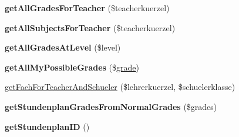 \begin{DoxyCompactItemize}
{\bfseries get\+All\+Grades\+For\+Teacher} (\$teacherkuerzel)
\item 
\mbox{\label{classstundenplandata_a04410dd17ae70a2995c9ba744c78d4b8}} 
{\bfseries get\+All\+Subjects\+For\+Teacher} (\$teacherkuerzel)
\item 
\mbox{\label{classstundenplandata_ad51fb9b961838ae004e1e857052d9a2c}} 
{\bfseries get\+All\+Grades\+At\+Level} (\$level)
\item 
\mbox{\label{classstundenplandata_ad59ea2d17858e909714558bb6c4b174a}} 
{\bfseries get\+All\+My\+Possible\+Grades} (\$\mbox{\hyperlink{classgrade}{grade}})
\item 
\mbox{\hyperlink{classstundenplandata_af2a1dfbc8f4fa77c9e85cd2a50027aa5}{get\+Fach\+For\+Teacher\+And\+Schueler}} (\$lehrerkuerzel, \$schuelerklasse)
\item 
\mbox{\label{classstundenplandata_ada49862c42f0fda4cc1d0385ba4ae032}} 
{\bfseries get\+Stundenplan\+Grades\+From\+Normal\+Grades} (\$grades)
\item 
\mbox{\label{classstundenplandata_a0802a23dd2a2d3bebd026d538b2f5b12}} 
{\bfseries get\+Stundenplan\+ID} ()
\end{DoxyCompactItemize}
